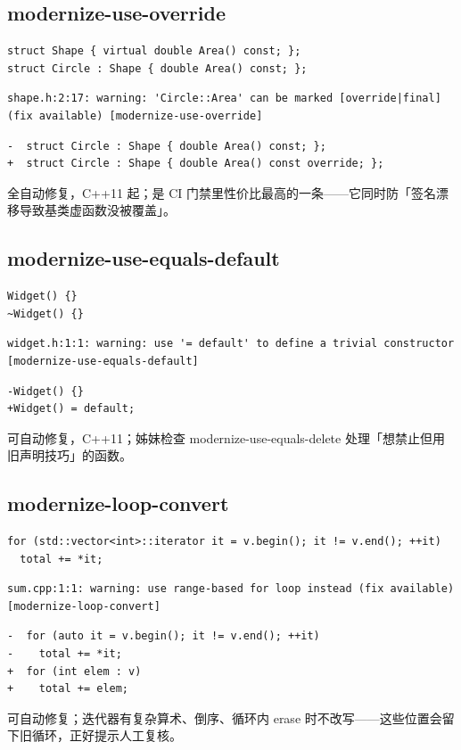 \documentclass[12pt,a4paper,fontset=fandol]{ctexbook}
\newcommand{\cpp}[1]{C++#1}
\begin{document}
\subsection{modernize-use-override}\label{sec:ch13-s3b}
\begin{lstlisting}[style=cppstyle]
struct Shape { virtual double Area() const; };
struct Circle : Shape { double Area() const; };
\end{lstlisting}
\begin{lstlisting}[style=shellstyle]
shape.h:2:17: warning: 'Circle::Area' can be marked [override|final] (fix available) [modernize-use-override]
\end{lstlisting}
\begin{lstlisting}[style=diffstyle]
-  struct Circle : Shape { double Area() const; };
+  struct Circle : Shape { double Area() const override; };
\end{lstlisting}
全自动修复，\cpp{11} 起；是 CI 门禁里性价比最高的一条——它同时防「签名漂移导致基类虚函数没被覆盖」。
\subsection{modernize-use-equals-default}\label{sec:ch13-s3c}
\begin{lstlisting}[style=cppstyle]
Widget() {}
~Widget() {}
\end{lstlisting}
\begin{lstlisting}[style=shellstyle]
widget.h:1:1: warning: use '= default' to define a trivial constructor [modernize-use-equals-default]
\end{lstlisting}
\begin{lstlisting}[style=diffstyle]
-Widget() {}
+Widget() = default;
\end{lstlisting}
可自动修复，\cpp{11}；姊妹检查 modernize-use-equals-delete 处理「想禁止但用旧声明技巧」的函数。
\subsection{modernize-loop-convert}\label{sec:ch13-s3d}
\begin{lstlisting}[style=cppstyle]
for (std::vector<int>::iterator it = v.begin(); it != v.end(); ++it)
  total += *it;
\end{lstlisting}
\begin{lstlisting}[style=shellstyle]
sum.cpp:1:1: warning: use range-based for loop instead (fix available) [modernize-loop-convert]
\end{lstlisting}
\begin{lstlisting}[style=diffstyle]
-  for (auto it = v.begin(); it != v.end(); ++it)
-    total += *it;
+  for (int elem : v)
+    total += elem;
\end{lstlisting}
可自动修复；迭代器有复杂算术、倒序、循环内 erase 时不改写——这些位置会留下旧循环，正好提示人工复核。
\end{document}
